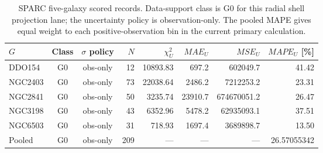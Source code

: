 \begin{table}[H]
\centering
\scriptsize
\caption{SPARC five-galaxy scored records. Data-support class is G0 for this radial shell projection lane; the uncertainty policy is observation-only. The pooled MAPE gives equal weight to each positive-observation bin in the current primary calculation.}
\begin{tabular}{lccrrrrr}
\toprule
$G$ & Class & $\sigma$ policy & $N$ & $\chi^2_U$ & $MAE_U$ & $MSE_U$ & $MAPE_U$ [\%]\\
\midrule
DDO154 & G0 & obs-only & 12 & 10893.83 & 697.2 & 602049.7 & 41.42\\
NGC2403 & G0 & obs-only & 73 & 22038.64 & 2486.2 & 7212253.2 & 23.31\\
NGC2841 & G0 & obs-only & 50 & 3235.74 & 23910.7 & 674670051.2 & 26.47\\
NGC3198 & G0 & obs-only & 43 & 6352.96 & 5478.2 & 62935093.1 & 37.51\\
NGC6503 & G0 & obs-only & 31 & 718.93 & 1697.4 & 3689898.7 & 13.50\\
\midrule
Pooled & G0 & obs-only & 209 & --- & --- & --- & 26.57055342\\
\bottomrule
\end{tabular}
\label{tab:manual-sparc-five-galaxy-scores}
\end{table}
